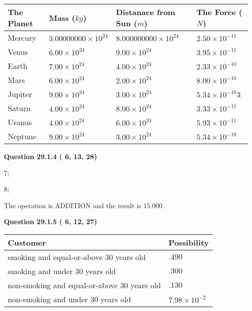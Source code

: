 \documentclass[12pt]{article}
\begin{document}
\vspace{0.2in}
 
 
\begin{tabular}{|l|l|l|l|}
\hline
The Planet & Mass ($kg$) & Distanace from Sun ($m$) & The Force ($N$)\\
\hline
Mercury  &
           $ %
3.00000000 \times 10^{24}  $   &
             $ %
8.000000000 \times 10^{24}$    & $ %
2.50 \times 10^{-11} $
\\  \hline
Venus    &
           $  %
6.00 \times 10^{24}  $     &
             $ %
9.00 \times 10^{24} $    & $ %
3.95 \times 10^{-11} $
\\  \hline
Earth    &
           $  %
7.00 \times 10^{24}$     &
             $ %
4.00 \times 10^{24} $    & $ %
2.33 \times 10^{-10} $
\\   \hline
Mars     &
           $  %
6.00 \times 10^{24} $     &
             $ %
2.00 \times 10^{24}$    & $ %
8.00 \times 10^{-10} $
\\   \hline
Jupiter  &
           $  %
9.00 \times 10^{24}  $    &
             $ %
3.00 \times 10^{24} $    & $ %
5.34 \times 10^{-10}3 $
\\  \hline
Saturn   &
           $  %
4.00 \times 10^{24}   $    &
             $ %
8.00 \times 10^{24}  $    & $ %
3.33 \times 10^{-11} $
\\  \hline
Uranus   &
           $  %
4.00 \times 10^{24} $    &
             $ %
6.00 \times 10^{24}$    & $ %
5.93 \times 10^{-11} $
\\  \hline
Neptune  &
           $  %
9.00 \times 10^{24}  $    &
             $ %
3.00 \times 10^{24} $    & $ %
5.34 \times 10^{-10} $
\\  \hline
 
\end{tabular}
 
 
  
  
{\textbf{\large{Question
29.1.4 
 (          6,         13,         28)
}}}

7;
 
8;
 
The operation is  %
ADDITION and the result is
$ %
15.000$.
 
  
  
{\textbf{\large{Question
29.1.5 
 (          6,         12,         27)
}}}

 
\noindent
\begin{tabular}{|l|l|}
\hline
Customer & Possibility \\
\hline
smoking  and  %
equal-or-above 30 years old &
  $ %
.490$ \\
\hline
smoking  and  %
under 30 years old &
  $ %
.300$ \\
\hline
 non-smoking and  %
equal-or-above 30 years old &
  $ %
.130$ \\
\hline
 non-smoking and  %
under 30 years old &
  $ %
7.98 \times 10^{-2}$ \\
\hline
\end{tabular}
 
\end{document}
